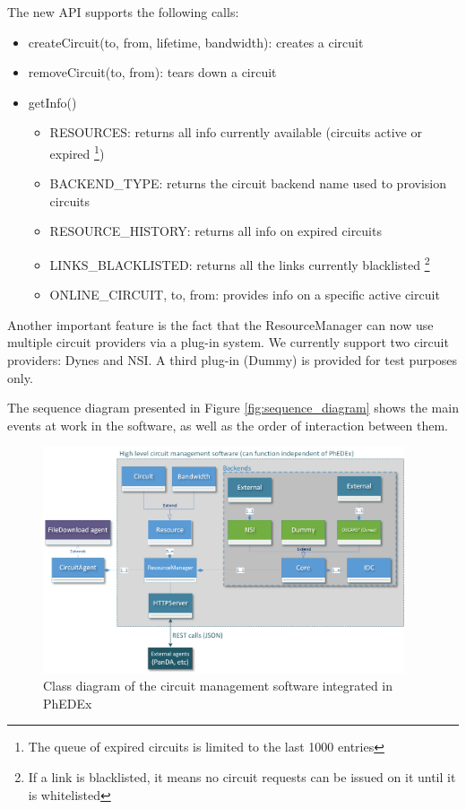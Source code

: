 The new API supports the following calls:
\begin{itemize}
  \item createCircuit(to, from, lifetime, bandwidth): creates a circuit
  \item removeCircuit(to, from): tears down a circuit
  \item getInfo()
	\begin{itemize}
		\item RESOURCES: returns all info currently available (circuits active or expired
		\footnote{The queue of expired circuits is limited to the last 1000 entries})
		\item BACKEND\_TYPE: returns the circuit backend name used to provision circuits
		\item RESOURCE\_HISTORY: returns all info on expired circuits
		\item LINKS\_BLACKLISTED: returns all the links currently blacklisted
		\footnote{If a link is blacklisted, it means no circuit requests can be issued on it
		until it is whitelisted}
		\item ONLINE\_CIRCUIT, to, from: provides info on a specific active circuit
	\end{itemize}
\end{itemize}

Another important feature is the fact that the ResourceManager can now use multiple circuit
providers via a plug-in system. We currently support two circuit providers: Dynes and NSI.
A third plug-in (Dummy) is provided for test purposes only.

The sequence diagram presented in Figure \ref{fig:sequence_diagram} shows the main events
at work in the software, as well as the order of interaction between them.

\begin{figure}[h]
  \centering
  \includegraphics[width=0.95\textwidth]{Figures/Circuit_framework-class_diagram.png}
  \caption{Class diagram of the circuit management software integrated in PhEDEx}
  \label{fig:class_diagram}
\end{figure} 

